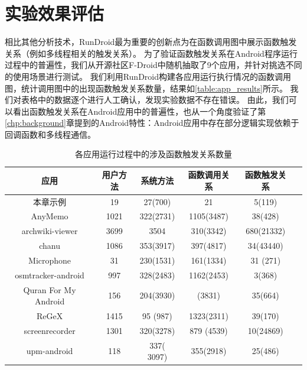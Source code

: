 \section{实验效果评估}

相比其他分析技术，RunDroid最为重要的创新点为在函数调用图中展示函数触发关系（例如多线程相关的触发关系）。
为了验证函数触发关系在Android程序运行过程中的普遍性，我们从开源社区F-Droid\cite{FDroidFr21:online}中随机抽取了9个应用，并针对挑选不同的使用场景进行测试。
我们利用RunDroid构建各应用运行执行情况的函数调用图，统计调用图中的出现函数触发关系数量，结果如\autoref{table:app_results}所示。
我们对表格中的数据逐个进行人工确认，发现实验数据不存在错误。
由此，我们可以看出函数触发关系在Android应用中的普遍性，也从一个角度验证了第\ref{chp:background}章提到的Android特性：Android应用中存在部分逻辑实现依赖于回调函数和多线程通信。

\begin{table}[!ht]
	\centering
	{
		\caption{各应用运行过程中的涉及函数触发关系数量}
		\label{table:app_results}
		\begin{tabular}{ |c |c|c|c|c|c|}
			\hline
			应用 &用户方法&系统方法&函数调用关系&函数触发关系\\ 
			\hline
		本章示例             & 19     & 27(700)     & 21                &5(119) \\ 				
			\hline			
			AnyMemo & 1021 & 322(2731) & 1105(3487)& 38(428) \\ 				
			\hline	
			archwiki-viewer & 3699 & 3504 & 310(3342)& 680(21332) \\ 				
			\hline	
			chanu & 1086& 353(3917) & 397(4817)& 34(43440) \\ 				
			\hline	
			Microphone & 31 & 230(1531) & 161(1334)&31 (271)\\ 				
			\hline	
			osmtracker-android & 997& 328(2483) & 1162(2453)& 3(368) \\ 				
			\hline	
			Quran For My Android & 156 & 204(3930) & (3831)&  35(664) \\ 				
			\hline	
			ReGeX & 1415 &95 (987) & 1323(2311)& 39(170)\\ 				
			\hline	
			screenrecorder& 1301 & 320(3278) &879 (4539)& 10(24869)\\ 				
			\hline	
			upm-android & 118& 337( 3097)& 355(2918)&  25(486) \\ 		
			\hline
		\end{tabular}
	}
\end{table}


